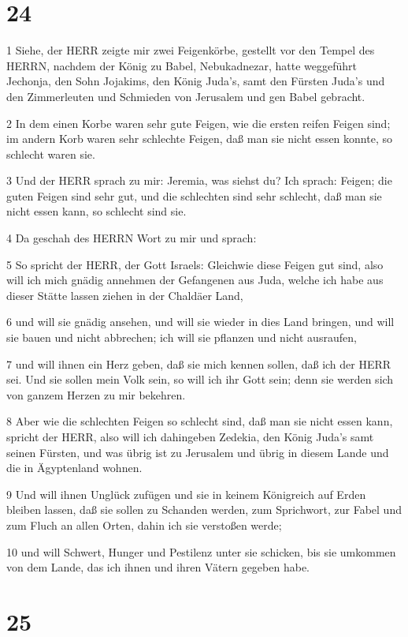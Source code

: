 \chapter{24}

\par 1 Siehe, der HERR zeigte mir zwei Feigenkörbe, gestellt vor den Tempel des HERRN, nachdem der König zu Babel, Nebukadnezar, hatte weggeführt Jechonja, den Sohn Jojakims, den König Juda's, samt den Fürsten Juda's und den Zimmerleuten und Schmieden von Jerusalem und gen Babel gebracht.
\par 2 In dem einen Korbe waren sehr gute Feigen, wie die ersten reifen Feigen sind; im andern Korb waren sehr schlechte Feigen, daß man sie nicht essen konnte, so schlecht waren sie.
\par 3 Und der HERR sprach zu mir: Jeremia, was siehst du? Ich sprach: Feigen; die guten Feigen sind sehr gut, und die schlechten sind sehr schlecht, daß man sie nicht essen kann, so schlecht sind sie.
\par 4 Da geschah des HERRN Wort zu mir und sprach:
\par 5 So spricht der HERR, der Gott Israels: Gleichwie diese Feigen gut sind, also will ich mich gnädig annehmen der Gefangenen aus Juda, welche ich habe aus dieser Stätte lassen ziehen in der Chaldäer Land,
\par 6 und will sie gnädig ansehen, und will sie wieder in dies Land bringen, und will sie bauen und nicht abbrechen; ich will sie pflanzen und nicht ausraufen,
\par 7 und will ihnen ein Herz geben, daß sie mich kennen sollen, daß ich der HERR sei. Und sie sollen mein Volk sein, so will ich ihr Gott sein; denn sie werden sich von ganzem Herzen zu mir bekehren.
\par 8 Aber wie die schlechten Feigen so schlecht sind, daß man sie nicht essen kann, spricht der HERR, also will ich dahingeben Zedekia, den König Juda's samt seinen Fürsten, und was übrig ist zu Jerusalem und übrig in diesem Lande und die in Ägyptenland wohnen.
\par 9 Und will ihnen Unglück zufügen und sie in keinem Königreich auf Erden bleiben lassen, daß sie sollen zu Schanden werden, zum Sprichwort, zur Fabel und zum Fluch an allen Orten, dahin ich sie verstoßen werde;
\par 10 und will Schwert, Hunger und Pestilenz unter sie schicken, bis sie umkommen von dem Lande, das ich ihnen und ihren Vätern gegeben habe.

\chapter{25}

